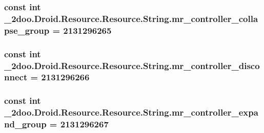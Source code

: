 \hypertarget{class__2doo_1_1_droid_1_1_resource_1_1_string_f66c9b11f4ff687c17e9eff73a86c072}{
\subsubsection[{mr\_\-controller\_\-collapse\_\-group}]{\setlength{\rightskip}{0pt plus 5cm}const int \_\-2doo.Droid.Resource.Resource.String.mr\_\-controller\_\-collapse\_\-group = 2131296265}}
\label{class__2doo_1_1_droid_1_1_resource_1_1_string_f66c9b11f4ff687c17e9eff73a86c072}


\hypertarget{class__2doo_1_1_droid_1_1_resource_1_1_string_ab60f05de7555c996c4c6c58e6c96ee6}{
\subsubsection[{mr\_\-controller\_\-disconnect}]{\setlength{\rightskip}{0pt plus 5cm}const int \_\-2doo.Droid.Resource.Resource.String.mr\_\-controller\_\-disconnect = 2131296266}}
\label{class__2doo_1_1_droid_1_1_resource_1_1_string_ab60f05de7555c996c4c6c58e6c96ee6}


\hypertarget{class__2doo_1_1_droid_1_1_resource_1_1_string_351d77cf30bb97621db54f6db8b2eeaa}{
\subsubsection[{mr\_\-controller\_\-expand\_\-group}]{\setlength{\rightskip}{0pt plus 5cm}const int \_\-2doo.Droid.Resource.Resource.String.mr\_\-controller\_\-expand\_\-group = 2131296267}}
\label{class__2doo_1_1_droid_1_1_resource_1_1_string_351d77cf30bb97621db54f6db8b2eeaa}


